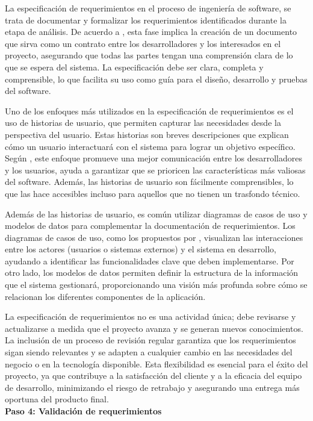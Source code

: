 		La especificación de requerimientos en el proceso de ingeniería de software, se trata de documentar y formalizar los requerimientos identificados durante la etapa de análisis. De acuerdo a \textcite{sommerville2011introduccion}, esta fase implica la creación de un documento que sirva como un contrato entre los desarrolladores y los interesados en el proyecto, asegurando que todas las partes tengan una comprensión clara de lo que se espera del sistema. La especificación debe ser clara, completa y comprensible, lo que facilita su uso como guía para el diseño, desarrollo y pruebas del software.
		
		Uno de los enfoques más utilizados en la especificación de requerimientos es el uso de historias de usuario, que permiten capturar las necesidades desde la perspectiva del usuario. Estas historias son breves descripciones que explican cómo un usuario interactuará con el sistema para lograr un objetivo específico. Según \textcite{cohn2004user}, este enfoque promueve una mejor comunicación entre los desarrolladores y los usuarios, ayuda a garantizar que se prioricen las características más valiosas del software. Además, las historias de usuario son fácilmente comprensibles, lo que las hace accesibles incluso para aquellos que no tienen un trasfondo técnico.
		
		Además de las historias de usuario, es común utilizar diagramas de casos de uso y modelos de datos para complementar la documentación de requerimientos. Los diagramas de casos de uso, como los propuestos por \textcite{booch2007object}, visualizan las interacciones entre los actores (usuarios o sistemas externos) y el sistema en desarrollo, ayudando a identificar las funcionalidades clave que deben implementarse. Por otro lado, los modelos de datos permiten definir la estructura de la información que el sistema gestionará, proporcionando una visión más profunda sobre cómo se relacionan los diferentes componentes de la aplicación.
		
		La especificación de requerimientos no es una actividad única; debe revisarse y actualizarse a medida que el proyecto avanza y se generan nuevos conocimientos. La inclusión de un proceso de revisión regular garantiza que los requerimientos sigan siendo relevantes y se adapten a cualquier cambio en las necesidades del negocio o en la tecnología disponible. Esta flexibilidad es esencial para el éxito del proyecto, ya que contribuye a la satisfacción del cliente y a la eficacia del equipo de desarrollo, minimizando el riesgo de retrabajo y asegurando una entrega más oportuna del producto final.\\
		\textbf{Paso 4: Validación de requerimientos}
		
